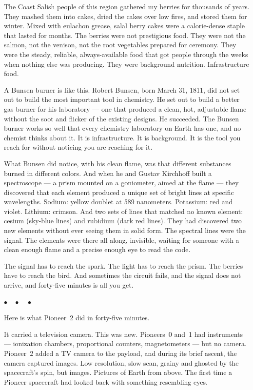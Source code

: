 \documentclass[12pt, letterpaper]{article}
\begin{document}
The Coast Salish people of this region gathered my berries for thousands of years. They mashed them into cakes, dried the cakes over low fires, and stored them for winter. Mixed with eulachon grease, salal berry cakes were a calorie-dense staple that lasted for months. The berries were not prestigious food. They were not the salmon, not the venison, not the root vegetables prepared for ceremony. They were the steady, reliable, always-available food that got people through the weeks when nothing else was producing. They were background nutrition. Infrastructure food.

A Bunsen burner is like this. Robert Bunsen, born March 31, 1811, did not set out to build the most important tool in chemistry. He set out to build a better gas burner for his laboratory --- one that produced a clean, hot, adjustable flame without the soot and flicker of the existing designs. He succeeded. The Bunsen burner works so well that every chemistry laboratory on Earth has one, and no chemist thinks about it. It is infrastructure. It is background. It is the tool you reach for without noticing you are reaching for it.

What Bunsen did notice, with his clean flame, was that different substances burned in different colors. And when he and Gustav Kirchhoff built a spectroscope --- a prism mounted on a goniometer, aimed at the flame --- they discovered that each element produced a unique set of bright lines at specific wavelengths. Sodium: yellow doublet at 589 nanometers. Potassium: red and violet. Lithium: crimson. And two sets of lines that matched no known element: cesium (sky-blue lines) and rubidium (dark red lines). They had discovered two new elements without ever seeing them in solid form. The spectral lines were the signal. The elements were there all along, invisible, waiting for someone with a clean enough flame and a precise enough eye to read the code.

The signal has to reach the spark. The light has to reach the prism. The berries have to reach the bird. And sometimes the circuit fails, and the signal does not arrive, and forty-five minutes is all you get.

\begin{center}
$\bullet\quad\bullet\quad\bullet$
\end{center}

Here is what Pioneer~2 did in forty-five minutes.

It carried a television camera. This was new. Pioneers~0 and~1 had instruments --- ionization chambers, proportional counters, magnetometers --- but no camera. Pioneer~2 added a TV camera to the payload, and during its brief ascent, the camera captured images. Low resolution, slow scan, grainy and ghosted by the spacecraft's spin, but images. Pictures of Earth from above. The first time a Pioneer spacecraft had looked back with something resembling eyes.
\end{document}
